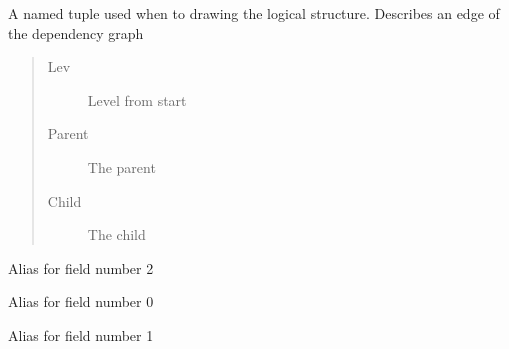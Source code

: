\documentclass[letterpaper,10pt,english]{sphinxmanual}
\begin{document}
\begin{fulllineitems}
\label{\detokenize{index:modelclass.node}}
\pysigstartsignatures
{}
\pysigstopsignatures
\sphinxAtStartPar
A named tuple used when to drawing the logical structure. Describes an edge of the dependency graph
\begin{quote}\begin{description}
\item[{Lev}] \leavevmode
\sphinxAtStartPar
Level from start

\item[{Parent}] \leavevmode
\sphinxAtStartPar
The parent

\item[{Child}] \leavevmode
\sphinxAtStartPar
The child

\end{description}\end{quote}

\begin{fulllineitems}
\label{\detokenize{index:modelclass.node.child}}
\pysigstartsignatures
{}
\pysigstopsignatures
\sphinxAtStartPar
Alias for field number 2

\end{fulllineitems}


\begin{fulllineitems}
\label{\detokenize{index:modelclass.node.lev}}
\pysigstartsignatures
{}
\pysigstopsignatures
\sphinxAtStartPar
Alias for field number 0

\end{fulllineitems}


\begin{fulllineitems}
\label{\detokenize{index:modelclass.node.parent}}
\pysigstartsignatures
{}
\pysigstopsignatures
\sphinxAtStartPar
Alias for field number 1

\end{fulllineitems}


\end{fulllineitems}
\end{document}
